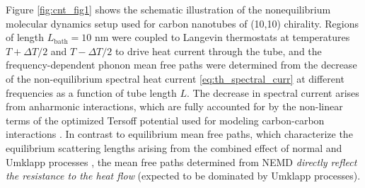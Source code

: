 Figure \ref{fig:cnt_fig1} shows the schematic illustration of the nonequilibrium molecular dynamics setup used for carbon nanotubes of (10,10) chirality. Regions of length $L_{\textrm{bath}}=10$ nm were coupled to Langevin thermostats at temperatures $T+\Delta T/2$ and $T-\Delta T/2$ to drive heat current through the tube, and the frequency-dependent phonon mean free paths were determined from the decrease of the non-equilibrium spectral heat current \eqref{eq:th_spectral_curr} at different frequencies as a function of tube length $L$. The decrease in spectral current arises from anharmonic interactions, which are fully accounted for by the non-linear terms of the optimized Tersoff potential used for modeling carbon-carbon interactions \cite{tersoff88a,lindsay10}. In contrast to equilibrium mean free paths, which characterize the equilibrium scattering lengths arising from the combined effect of normal and Umklapp processes \cite{mcgaughey04}, the mean free paths determined from NEMD \textit{directly reflect the resistance to the heat flow} (expected to be dominated by Umklapp processes). %


